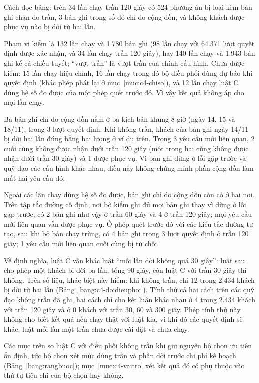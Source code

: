 Cách đọc bảng: trên 34 lần chạy trần 120 giây có 524 phương án bị loại kèm bản ghi chặn do trần, 3 bản ghi trong số
đó chỉ do cộng dồn, và không khách được phục vụ nào bị dời từ hai lần.

Phạm vi kiểm là 132 lần chạy và 1.780 bản ghi (98 lần chạy với 64.371 lượt quyết định được xác nhận, và 34 lần chạy
trần 120 giây), hay 140 lần chạy và 1.943 bản ghi kể cả chiều tuyết; ``vượt trần'' là vượt trần của chính cấu hình.
Chưa được kiểm: 15 lần chạy hiệu chỉnh, 16 lần chạy trong đó bộ điều phối dùng dự báo khi quyết định (khác phép phát
lại ở mục~\ref{muc:c4-chiso}), và 12 lần chạy luật C dùng hệ số đo được của một phép quét trước đó. Vì vậy kết quả
không áp cho mọi lần chạy.

Ba bản ghi chỉ do cộng dồn nằm ở ba kịch bản khung 8 giờ (ngày 14, 15 và 18/11), trong 3 lượt quyết định. Khi không
trần, khách của bản ghi ngày 14/11 bị dời hai lần đúng bằng hai lượng ở ví dụ trên. Trong 3 yêu cầu mới liên quan, 2
cuối cùng không được nhận dưới trần 120 giây (một trong hai cũng không được nhận dưới trần 30 giây) và 1 được phục vụ.
Vì bản ghi dừng ở lỗi gặp trước và quỹ đạo các cấu hình khác nhau, điều này không chứng minh phần cộng dồn làm mất hai
yêu cầu đó.

Ngoài các lần chạy dùng hệ số đo được, bản ghi chỉ do cộng dồn còn có ở hai nơi. Trên tập tắc đường cố định, nơi bộ
kiểm ghi đủ mọi bản ghi thay vì dừng ở lỗi gặp trước, có 2 bản ghi như vậy ở trần 60 giây và 4 ở trần 120 giây; mọi
yêu cầu mới liên quan vẫn được phục vụ. Ở phép quét trước đó với các kiểu tắc đường tự tạo, sau khi bỏ bản chạy trùng,
có 4 bản ghi trong 3 lượt quyết định ở trần 120 giây; 1 yêu cầu mới liên quan cuối cùng bị từ chối.

Về định nghĩa, luật C vẫn khác luật ``mỗi lần dời không quá 30 giây'': luật sau cho phép một khách bị dời ba lần, tổng
90 giây, còn luật C với trần 30 giây thì không. Trên số liệu, khác biệt này hiếm: khi không trần, chỉ 12 trong 2.434
khách bị dời từ hai lần (Bảng~\ref{bang:c4-doidieuphoi}). Tính thử cả hai cách trên các quỹ đạo không trần đã ghi, hai
cách chỉ cho kết luận khác nhau ở 4 trong 2.434 khách với trần 120 giây và ở 0 khách với trần 30, 60 và 300 giây.
Phép tính thử này không cho biết kết quả nếu chạy thật với luật kia, vì khi đó các quyết định sẽ khác; luật mỗi lần
một trần chưa được cài đặt và chưa chạy.

Các mục trên so luật C với điều phối không trần khi giữ nguyên bộ chọn ưu tiên ổn định, tức bộ chọn xét mức dùng trần
và phần dời trước chi phí kế hoạch (Bảng~\ref{bang:rangbuoc}); mục~\ref{muc:c4-vaitro} xét kết quả đó có phụ thuộc vào
thứ tự tiêu chí của bộ chọn hay không.
